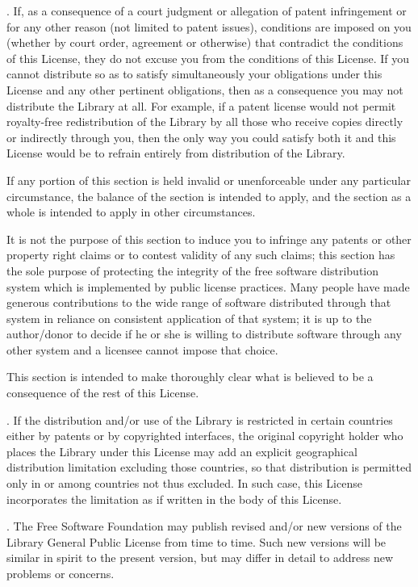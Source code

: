 . If, as a consequence of a court judgment or allegation of patent infringement or for any other reason (not limited to patent issues), conditions are imposed on you (whether by court order, agreement or otherwise) that contradict the conditions of this License, they do not excuse you from the conditions of this License. If you cannot distribute so as to satisfy simultaneously your obligations under this License and any other pertinent obligations, then as a consequence you may not distribute the Library at all. For example, if a patent license would not permit royalty-free redistribution of the Library by all those who receive copies directly or indirectly through you, then the only way you could satisfy both it and this License would be to refrain entirely from distribution of the Library. 

If any portion of this section is held invalid or unenforceable under any particular circumstance, the balance of the section is intended to apply, and the section as a whole is intended to apply in other circumstances. 

It is not the purpose of this section to induce you to infringe any patents or other property right claims or to contest validity of any such claims; this section has the sole purpose of protecting the integrity of the free software distribution system which is implemented by public license practices. Many people have made generous contributions to the wide range of software distributed through that system in reliance on consistent application of that system; it is up to the author/donor to decide if he or she is willing to distribute software through any other system and a licensee cannot impose that choice. 

This section is intended to make thoroughly clear what is believed to be a consequence of the rest of this License. 

. If the distribution and/or use of the Library is restricted in certain countries either by patents or by copyrighted interfaces, the original copyright holder who places the Library under this License may add an explicit geographical distribution limitation excluding those countries, so that distribution is permitted only in or among countries not thus excluded. In such case, this License incorporates the limitation as if written in the body of this License. 

. The Free Software Foundation may publish revised and/or new versions of the Library General Public License from time to time. Such new versions will be similar in spirit to the present version, but may differ in detail to address new problems or concerns. 


